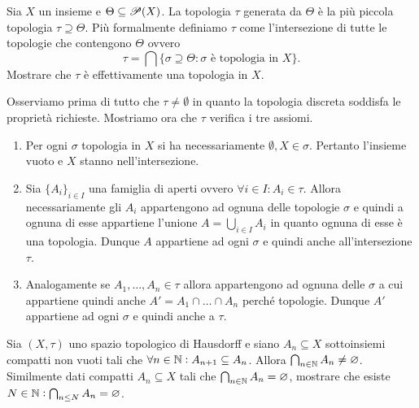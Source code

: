 \begin{es}
  Sia $ X $ un insieme e $ \Theta \subseteq \P(X) $. La topologia $ \tau $ generata da $ \Theta $ è la più piccola topologia $ \tau \supseteq \Theta $. Più formalmente definiamo $ \tau $ come l'intersezione di tutte le topologie che contengono $ \Theta $ ovvero \[\tau = \bigcap \{\sigma \supseteq \Theta : \sigma \text{ è topologia in } X\}.\] Mostrare che $ \tau $ è effettivamente una topologia in $ X $.
\end{es}
%
Osserviamo prima di tutto che $ \tau \neq \emptyset $ in quanto la topologia discreta soddisfa le proprietà richieste. Mostriamo ora che $ \tau $ verifica i tre assiomi.
\begin{enumerate}[label = (\roman*)]
\item Per ogni $ \sigma $ topologia in $ X $ si ha necessariamente $ \emptyset, X \in \sigma $. Pertanto l'insieme vuoto e $ X $ stanno nell'intersezione.
\item Sia $ \{A_i\}_{i \in I} $ una famiglia di aperti ovvero $ \forall i \in I : A_{i} \in \tau $. Allora necessariamente gli $ A_i $ appartengono ad ognuna delle topologie $ \sigma $ e quindi a ognuna di esse appartiene l'unione $ A = \bigcup_{i \in I} A_i $ in quanto ognuna di esse è una topologia. Dunque $ A $ appartiene ad ogni $ \sigma $ e quindi anche all'intersezione $ \tau $.
\item Analogamente se $ A_1, \ldots, A_n \in \tau $ allora appartengono ad ognuna delle $ \sigma $ a cui appartiene quindi anche $ A' = A_1 \cap \ldots \cap A_n $ perché topologie. Dunque $ A' $ appartiene ad ogni $ \sigma $ e quindi anche a $ \tau $.
\end{enumerate}

\begin{es}
  Sia $ (X, \tau) $ uno spazio topologico di Hausdorff e siano $ A_n \subseteq X $ sottoinsiemi compatti non vuoti tali che $ \forall n \in \N : A_{n + 1} \subseteq A_n $. Allora $ \bigcap_{n \in \N} A_n \neq \emptyset $. \\
  Similmente dati compatti $ A_n \subseteq X $ tali che $ \bigcap_{n \in \N} A_n = \emptyset $, mostrare che esiste $ N \in \N : \bigcap_{n \leq N} A_n = \emptyset $.
\end{es}
%

